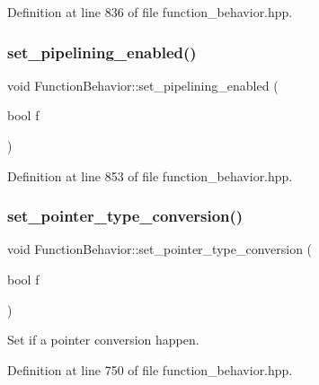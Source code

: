 Definition at line 836 of file function\+\_\+behavior.\+hpp.

\mbox{\label{classFunctionBehavior_ada30b8554c0902020ba451004ebd4f30}} 
\subsubsection{\texorpdfstring{set\+\_\+pipelining\+\_\+enabled()}{set\_pipelining\_enabled()}}
{\footnotesize\ttfamily void Function\+Behavior\+::set\+\_\+pipelining\+\_\+enabled (\begin{DoxyParamCaption}\item[{bool}]{f }\end{DoxyParamCaption})\hspace{0.3cm}{\ttfamily [inline]}}



Definition at line 853 of file function\+\_\+behavior.\+hpp.

\mbox{\label{classFunctionBehavior_af013fcbd63fa813988b860f382ab1857}} 
\subsubsection{\texorpdfstring{set\+\_\+pointer\+\_\+type\+\_\+conversion()}{set\_pointer\_type\_conversion()}}
{\footnotesize\ttfamily void Function\+Behavior\+::set\+\_\+pointer\+\_\+type\+\_\+conversion (\begin{DoxyParamCaption}\item[{bool}]{f }\end{DoxyParamCaption})\hspace{0.3cm}{\ttfamily [inline]}}



Set if a pointer conversion happen. 



Definition at line 750 of file function\+\_\+behavior.\+hpp.

